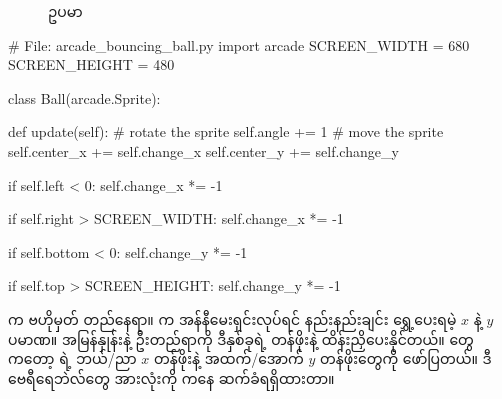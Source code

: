 \begin{figure}[tbh!]
\caption{ ဥပမာ} 
\label{fig:ch10Bouncing}
\end{figure}

%
\begin{py}
# File: arcade_bouncing_ball.py
import arcade
SCREEN_WIDTH = 680
SCREEN_HEIGHT = 480


class Ball(arcade.Sprite):

    def update(self):
        # rotate the sprite
        self.angle += 1
        # move the sprite
        self.center_x += self.change_x
        self.center_y += self.change_y

        if self.left < 0:
            self.change_x *= -1

        if self.right > SCREEN_WIDTH:
            self.change_x *= -1

        if self.bottom < 0:
            self.change_y *= -1

        if self.top > SCREEN_HEIGHT:
            self.change_y *= -1
\end{py}
%

\fEn{,}  က  ဗဟိုမှတ် တည်နေရာ။ \fEn{,}  က အန်နီမေးရှင်းလုပ်ရင် နည်းနည်းချင်း ရွှေ့ပေးရမဲ့ $x$ နဲ့  $y$ ပမာဏ။  အမြန်နှုန်းနဲ့ ဦးတည်ရာကို ဒီနှစ်ခုရဲ့ တန်ဖိုးနဲ့ ထိန်းညှိပေးနိုင်တယ်။ \fEn{,} \fEn{,} \fEn{,}   တွေကတော့    ရဲ့ ဘယ်/ညာ $x$ တန်ဖိုးနဲ့  အထက်/အောက် $y$ တန်ဖိုးတွေကို ဖော်ပြတယ်။ ဒီ ဗေရီရေဘဲလ်တွေ အားလုံးကို   ကနေ ဆက်ခံရရှိထားတာ။ 

